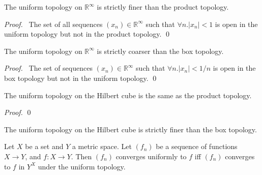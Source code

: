 \begin{prop}
The uniform topology on $\mathbb{R}^\infty$ is strictly finer than the product topology.
\end{prop}

\begin{proof}
\pf\ The set of all sequences $(x_n) \in \mathbb{R}^\infty$ such that $\forall n. |x_n| < 1$ is open in the uniform topology but not in the product topology. \qed
\end{proof}

\begin{prop}
The uniform topology on $\mathbb{R}^\infty$ is strictly coarser than the box topology.
\end{prop}

\begin{proof}
\pf\ The set of sequences $(x_n) \in \mathbb{R}^\infty$ such that $\forall n. |x_n| < 1/n$ is open in the box topology but not in the uniform topology. \qed
\end{proof}

\begin{prop}
The uniform topology on the Hilbert cube is the same as the product topology.
\end{prop}

\begin{proof}
\pf
{}
\qed
\end{proof}

\begin{cor}
The uniform topology on the Hilbert cube is strictly finer than the box topology.
\end{cor}

\begin{prop}
Let $X$ be a set and $Y$ a metric space. Let $(f_n)$ be a sequence of functions $X \rightarrow Y$, and $f : X \rightarrow Y$. Then $(f_n)$ converges uniformly to $f$ iff $(f_n)$ converges to $f$ in $Y^X$ under the uniform topology.
\end{prop}

